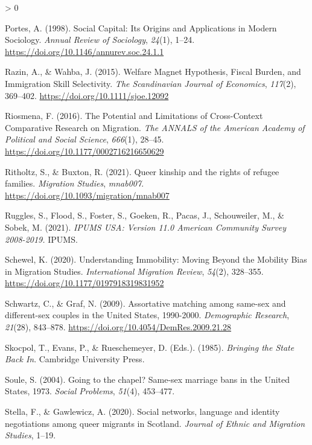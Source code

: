 \documentclass[
  12pt,
]{article}
\newlength{\cslhangindent}
\newenvironment{CSLReferences}[2] %
 {%
  \setlength{\parindent}{0pt}
  \ifodd #1 \everypar{\setlength{\hangindent}{\cslhangindent}}\ignorespaces\fi
  \ifnum #2 > 0
  \setlength{\parskip}{#2\baselineskip}
  \fi
 }%
 {}
\begin{document}
\begin{CSLReferences}{1}{0}
\leavevmode\hypertarget{ref-portes_1998}{}%
Portes, A. (1998). Social {Capital}: Its {Origins} and {Applications} in {Modern Sociology}. \emph{Annual Review of Sociology}, \emph{24}(1), 1--24. \url{https://doi.org/10.1146/annurev.soc.24.1.1}

\leavevmode\hypertarget{ref-razin_2015}{}%
Razin, A., \& Wahba, J. (2015). Welfare {Magnet Hypothesis}, {Fiscal Burden}, and {Immigration Skill Selectivity}. \emph{The Scandinavian Journal of Economics}, \emph{117}(2), 369--402. \url{https://doi.org/10.1111/sjoe.12092}

\leavevmode\hypertarget{ref-riosmena_2016_potential}{}%
Riosmena, F. (2016). The {Potential} and {Limitations} of {Cross}-{Context Comparative Research} on {Migration}. \emph{The ANNALS of the American Academy of Political and Social Science}, \emph{666}(1), 28--45. \url{https://doi.org/10.1177/0002716216650629}

\leavevmode\hypertarget{ref-ritholtz_2021_queer}{}%
Ritholtz, S., \& Buxton, R. (2021). Queer kinship and the rights of refugee families. \emph{Migration Studies}, \emph{mnab007}. \url{https://doi.org/10.1093/migration/mnab007}

\leavevmode\hypertarget{ref-ruggles_2021}{}%
Ruggles, S., Flood, S., Foster, S., Goeken, R., Pacas, J., Schouweiler, M., \& Sobek, M. (2021). \emph{{IPUMS USA}: Version 11.0 {American Community Survey} 2008-2019.} {IPUMS}.

\leavevmode\hypertarget{ref-schewel_2020}{}%
Schewel, K. (2020). Understanding {Immobility}: Moving {Beyond} the {Mobility Bias} in {Migration Studies}. \emph{International Migration Review}, \emph{54}(2), 328--355. \url{https://doi.org/10.1177/0197918319831952}

\leavevmode\hypertarget{ref-schwartz_2009}{}%
Schwartz, C., \& Graf, N. (2009). Assortative matching among same-sex and different-sex couples in the {United States}, 1990-2000. \emph{Demographic Research}, \emph{21}(28), 843--878. \url{https://doi.org/10.4054/DemRes.2009.21.28}

\leavevmode\hypertarget{ref-skocpol_1985}{}%
Skocpol, T., Evans, P., \& Rueschemeyer, D. (Eds.). (1985). \emph{Bringing the {State Back In}}. {Cambridge University Press}.

\leavevmode\hypertarget{ref-soule_2004}{}%
Soule, S. (2004). Going to the chapel? Same-sex marriage bans in the {United States}, 1973{}. \emph{Social Problems}, \emph{51}(4), 453--477.

\leavevmode\hypertarget{ref-stella_2020}{}%
Stella, F., \& Gawlewicz, A. (2020). Social networks, language and identity negotiations among queer migrants in {Scotland}. \emph{Journal of Ethnic and Migration Studies}, 1--19.


\end{CSLReferences}
\end{document}
